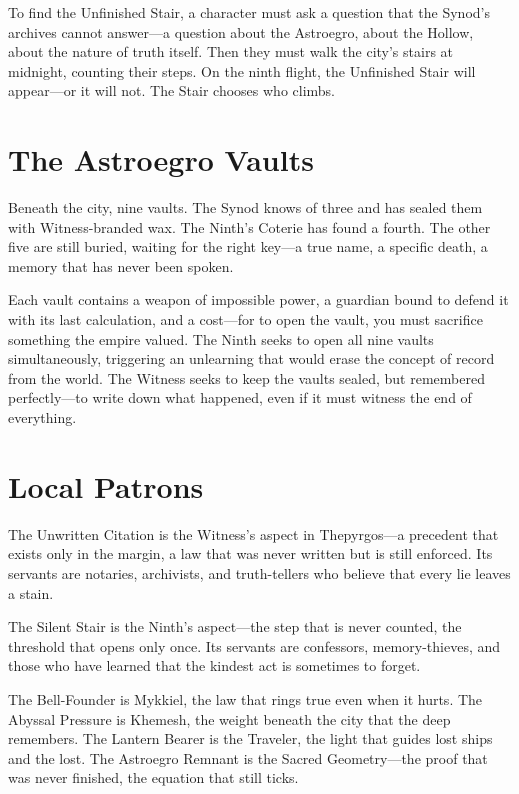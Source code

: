 \documentclass[10pt,twocolumn]{book}
\begin{document}
To find the Unfinished Stair, a character must ask a question that the Synod's archives cannot answer---a question about the Astroegro, about the Hollow, about the nature of truth itself. Then they must walk the city's stairs at midnight, counting their steps. On the ninth flight, the Unfinished Stair will appear---or it will not. The Stair chooses who climbs.

\section{The Astroegro Vaults}

Beneath the city, nine vaults. The Synod knows of three and has sealed them with Witness-branded wax. The Ninth's Coterie has found a fourth. The other five are still buried, waiting for the right key---a true name, a specific death, a memory that has never been spoken.

Each vault contains a weapon of impossible power, a guardian bound to defend it with its last calculation, and a cost---for to open the vault, you must sacrifice something the empire valued. The Ninth seeks to open all nine vaults simultaneously, triggering an unlearning that would erase the concept of record from the world. The Witness seeks to keep the vaults sealed, but remembered perfectly---to write down what happened, even if it must witness the end of everything.

\section{Local Patrons}

The Unwritten Citation is the Witness's aspect in Thepyrgos---a precedent that exists only in the margin, a law that was never written but is still enforced. Its servants are notaries, archivists, and truth-tellers who believe that every lie leaves a stain.

The Silent Stair is the Ninth's aspect---the step that is never counted, the threshold that opens only once. Its servants are confessors, memory-thieves, and those who have learned that the kindest act is sometimes to forget.

The Bell-Founder is Mykkiel, the law that rings true even when it hurts. The Abyssal Pressure is Khemesh, the weight beneath the city that the deep remembers. The Lantern Bearer is the Traveler, the light that guides lost ships and the lost. The Astroegro Remnant is the Sacred Geometry---the proof that was never finished, the equation that still ticks.
\end{document}
